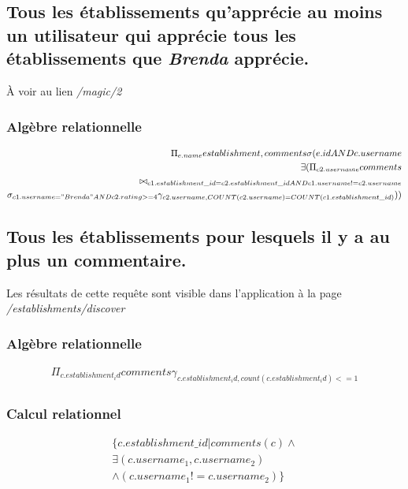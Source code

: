 \documentclass[a4paper,10pt]{article}
\begin{document}
\subsection{Tous les établissements qu'apprécie au moins un utilisateur qui
apprécie tous les établissements que \emph{Brenda} apprécie.}
    À voir au lien \emph{/magic/2}
    

\subsubsection{Algèbre relationnelle}
    \begin{align}
        \Pi_{e.name}establishment, comments \sigma(e.id AND c.username \\
        \exists(\Pi_{c2.username}comments \\
        \bowtie_{c1.establishment\_id=c2.establishment\_id AND c1.username!=c2.username} \\
        \sigma_{c1.username="Brenda" AND c2.rating>=4}
        \gamma_{c2.username, COUNT(c2.username)=COUNT(c1.establishment\_id)}
        ))
    \end{align}

\subsection{Tous les établissements pour lesquels il y a au plus un
commentaire.}
    Les résultats de cette requête sont visible dans l'application à la page
    \emph{/establishments/discover}
    

\subsubsection{Algèbre relationnelle}
    \begin{align}
        \Pi_{c.establishment_id}comments
        \gamma_{c.establishment_id, count(c.establishment_id)<=1}
    \end{align}

\subsubsection{Calcul relationnel}
\begin{align}
    \{ c.establishment\_id | comments(c) \wedge \\
    \exists (c.username_1, c.username_2) \\
    \wedge (c.username_1 != c.username_2) \}
\end{align}
\end{document}
